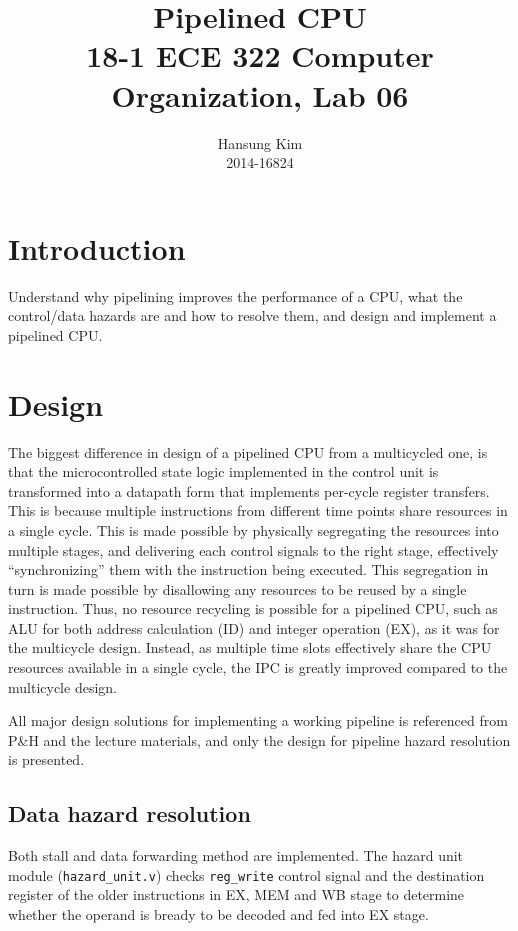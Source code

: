 \documentclass[12pt]{article}
\title{Pipelined CPU \\
\large 18-1 ECE 322 Computer Organization, Lab 06}
\author{Hansung Kim \\ 2014-16824}
\date{}
\begin{document}
\maketitle

\section{Introduction}
Understand why pipelining improves the performance of a CPU, what the
control/data hazards are and how to resolve them, and design and
implement a pipelined CPU.

\section{Design}
The biggest difference in design of a pipelined CPU from a multicycled
one, is that the microcontrolled state logic implemented in the
control unit is transformed into a datapath form that implements
per-cycle register transfers.  This is because multiple instructions
from different time points share resources in a single cycle.  This is
made possible by physically segregating the resources into multiple
stages, and delivering each control signals to the right stage,
effectively ``synchronizing'' them with the instruction being
executed.  This segregation in turn is made possible by disallowing
any resources to be reused by a single instruction.  Thus, no resource
recycling is possible for a pipelined CPU, such as ALU for both
address calculation (ID) and integer operation (EX), as it was for the
multicycle design.  Instead, as multiple time slots effectively share
the CPU resources available in a single cycle, the IPC is greatly
improved compared to the multicycle design.

All major design solutions for implementing a working pipeline is
referenced from P\&H and the lecture materials, and only the design
for pipeline hazard resolution is presented.

\subsection{Data hazard resolution}

Both stall and data forwarding method are implemented.  The hazard
unit module (\texttt{hazard\_unit.v}) checks \texttt{reg\_write}
control signal and the destination register of the older instructions
in EX, MEM and WB stage to determine whether the operand is bready to
be decoded and fed into EX stage.
\end{document}
